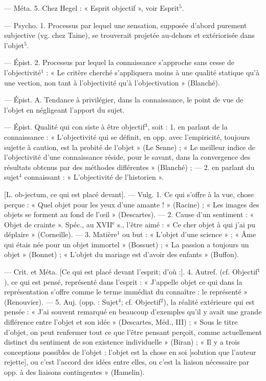 \begin{itemize}[leftmargin=1cm, label=, itemsep=1pt]
— Méta. 5. Chez Hegel : « Esprit
objectif », voir Esprit$^5$.

 — Psycho. 1. Processus
par lequel une sensation, supposée d’abord purement subjective
(vg. chez Taine), se trouverait
projetée au-dehors et extériorisée
dans l’objet$^5$.

— Épist. 2. Processus par lequel
la connaissance s'approche sans
cesse de l’objectivité$^1$ : « Le critère
cherché s’appliquera moins à une
qualité statique qu’à une vection,
non tant à l’objectivité qu’à l’objectivation » (Blanché).

 — Épist. A. Tendance
à privilégier, dans la connaissance,
le point de vue de l’objet en négligeant l’apport du sujet.

 — Épist. Qualité qui con
siste à être objectif$^3$, soit : 1. en
parlant de la connaissance : « L'objectivité qui se définit, en opp. avec
l'empiricité, toujours sujette à caution, est la probité de l’objet » (Le
Senne) ; « Le meilleur indice de
l’objectivité d’une connaissance réside, pour le savant, dans la convergence des résultats obtenus par des
méthodes diflérentes » (Blanché) ; —
2. en parlant du sujet$^4$ connaissant :
« L’objectivité de l'historien ».

 [L. ob-jectum, ce qui est placé
devant]. — Vulg. 1. Ce qui s'offre à
la vue, chose perçue : « Quel objet
pour les yeux d’une amante ! »
(Racine) ; « Les images des objets se
forment au fond de l'œil » (Descartes). — 2. Cause d’un sentiment :
« Objet de crainte ». Spéc., au
{\footnotesize XVII}$^\text{e}$ s., l'être aimé : « Ce cher objet
à qui j'ai pu déplaire » (Corneille). —
3. Matière$^1$ ou but : « L'objet d’une
science » ; « Âme qui étais née pour
un objet immortel » (Bossuet) ; « La
passion a toujours un objet » (Bonnet) ; « L'objet du mariage est d’avoir
des enfants » (Buffon).

— Crit. et Méta. [Ce qui est placé
devant l'esprit; d'où :]. 4. Autref.
(cf. Objectif$^1$), ce qui est pensé,
représenté dans l'esprit : « J’appelle
objet ce qui dans la représentation
s'offre comme le terme immédiat du
connaître : le représenté » (Renouvier). — 5. Auj. (opp. : Sujet$^4$; cf.
Objectif$^2$), la réalité extérieure qui
est pensée : « J’ai souvent remarqué
en beaucoup d'exemples qu'il y
avait une grande diflérence entre
l’objet et son idée » (Descartes,
Méd., III) ; « Sous le titre d'objet,
on peut renfermer tout ce que l'être
pensant perçoit, comme actuellement distinct du sentiment de son
existence individuelle » (Biran) ; « Il
y a trois conceptions possibles de
l’objet : l'objet est la chose en soi
[solution que l’auteur rejette], ou
c’est l’accord des idées entre elles,
ou c’est la liaison nécessaire par
opp. à des liaisons contingentes »
(Hamelin).


\end{itemize}
